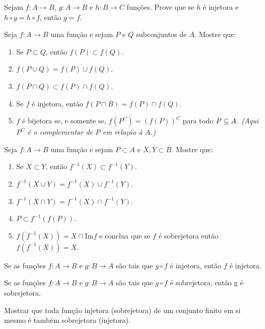 \documentclass[12pt]{exam}
\begin{document}
\vspace{.3cm}

\questao Sejam $f : A \to B$, $g : A \to B$ e $h : B \to C$ funções. Prove que se $h$ é injetora e $h \circ g = h \circ f$, então $g = f$.

\vspace{.3cm}

\questao Seja $f : A \to B$ uma função e sejam $P$ e $Q$ subconjuntos de $A$. Mostre que:
\begin{enumerate}[label={\alph*})]
	\item Se $P\subset Q$, ent{\~a}o $f(P)\subset f(Q)$.
	\item $f(P\cup Q) = f(P)\cup f(Q)$.
	\item $f(P\cap Q)\subset f(P)\cap f(Q)$.
	\item Se $f$ {\'e} injetora, ent{\~a}o $f(P\cap B) =  f(P)\cap f(Q)$.
	\item $f$ {\'e} bijetora se, e somente se, $f(P^C) = (f(P))^C$ para todo $P \subseteq A$. \textit{(Aqui $P^C$ é o complementar de $P$ em relação à $A$.)}
\end{enumerate}

\vspace{.3cm}

\questao Seja $f : A \to B$ uma fun{\c c}{\~a}o e sejam $P \subset
A$ e $X, Y\subset B$. Mostre que:
\begin{enumerate}[label={\alph*})]
	\item Se $X\subset Y$, ent{\~a}o $f^{-1}(X)\subset f^{-1}(Y)$.
	\item $f^{-1}(X\cup Y)=f^{-1}(X)\cup f^{-1}(Y)$.
	\item $f^{-1}(X\cap Y)= f^{-1}(X)\cap f^{-1}(Y)$.
	\item $P\subset f^{-1}(f(P))$.
	\item $f(f^{-1}(X))= X \cap \mbox{Im}f$ e conclua que se $f$ {\'e} sobrejetora ent{\~a}o
	$f(f^{-1}(X))=X$.
\end{enumerate}

\vspace{.3cm}

\questao Se as fun{\c c}{\~o}es $f : A \to B$ e $g : B\to A$ s{\~a}o
tais que $g\circ f$ {\'e} injetora, ent{\~a}o $f$ {\'e} injetora.

\vspace{.3cm}

\questao Se as fun{\c c}{\~o}es $f : A \to B$ e $g : B\to A$ s{\~a}o
tais que $g\circ f$ {\'e} sobrejetora, ent{\~a}o g {\'e} sobrejetora.

\vspace{.3cm}

\questao Mostrar que toda fun{\c c}{\~a}o injetora (sobrejetora) de um conjunto finito em si mesmo {\'e} tamb{\'e}m sobrejetora (injetora).
\end{document}
